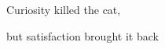 \thispagestyle{empty}
\vspace{17cm}

\begin{flushright}
\Large
\itshape{Curiosity killed the cat,
	
	but satisfaction brought it back}
\end{flushright}

